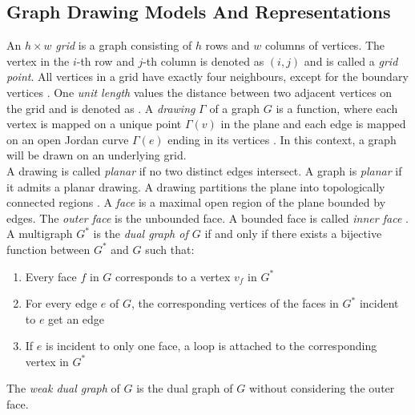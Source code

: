 
\subsection{Graph Drawing Models And Representations}
An $h \times w$ \emph{grid} is a graph consisting of $h$ rows and $w$ columns of vertices. The vertex in the $i$-th row and $j$-th column is denoted as $(i,j)$ and is called a \emph{grid point}. All vertices in a grid have exactly four neighbours, except for the boundary vertices \cite[P. 760]{DBLP:cormen_intro_to_algorithms}. One \emph{unit length} values the distance between two adjacent vertices on the grid and is denoted as \UL.
A \emph{drawing} $\Gamma$ of a graph $G$ is a function, where each vertex is mapped on a unique point $\Gamma(v)$ in the plane and each edge is mapped on an open Jordan curve $\Gamma(e)$ ending in its vertices \cite[P. 225]{Duncan_planar_polyline_drawings}. In this context, a graph will be drawn on an underlying grid.\\
A drawing is called \emph{planar} if no two distinct edges intersect. 
A graph is \emph{planar} if it admits a planar drawing\cite[Page 100]{DBLP:cormen_intro_to_algorithms}.
A drawing partitions the plane into topologically connected regions \cite[P. 7]{battista_1999}. A \emph{face} is a maximal open region of the plane bounded by edges. The \emph{outer face} is the unbounded face. A bounded face is called \emph{inner face} \cite[S. 86]{Diestel_GraphTheory}.\\
A multigraph $G^*$ is the \emph{dual graph of $G$} if and only if there exists a bijective function between $G^*$ and $G$ such that:
\begin{enumerate}
	\item Every face $f$ in $G$ corresponds to a vertex $v_f$ in $G^*$
	\item For every edge $e$ of $G$, the corresponding vertices of the faces in $G^*$ incident to $e$ get an edge 
	\item If $e$ is incident to only one face, a loop is attached to the corresponding vertex in $G^*$
\end{enumerate}\cite[P. 103]{Diestel_GraphTheory}
The \emph{weak dual graph} of $G$ is the dual graph of $G$ without considering the outer face.\\

